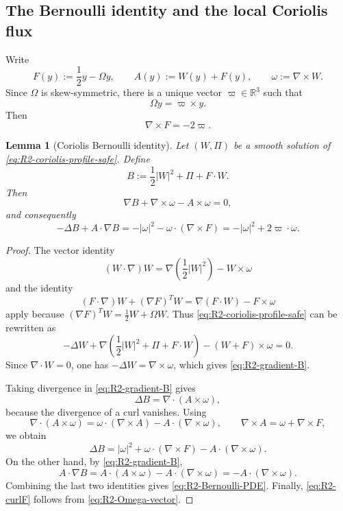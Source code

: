 \documentclass[11pt]{amsart}
\numberwithin{equation}{section}
\theoremstyle{plain}
\newtheorem{lemma}[theorem]{Lemma}
\theoremstyle{definition}
\theoremstyle{remark}
\begin{document}
\subsection{The Bernoulli identity and the local Coriolis flux}

Write
\begin{equation}\label{eq:R2-F-def}
   F(y):=\frac12y-\Omega y,
   \qquad
   A(y):=W(y)+F(y),
   \qquad
   \omega:=\nabla\times W .
\end{equation}
Since \(\Omega\) is skew-symmetric, there is a unique vector
\(\varpi\in\mathbb R^3\) such that
\begin{equation}\label{eq:R2-Omega-vector}
   \Omega y=\varpi\times y .
\end{equation}
Then
\begin{equation}\label{eq:R2-curlF}
   \nabla\times F=-2\varpi .
\end{equation}

\begin{lemma}[Coriolis Bernoulli identity]
\label{lem:R2-coriolis-bernoulli}
Let \((W,\Pi)\) be a smooth solution of
\eqref{eq:R2-coriolis-profile-safe}.  Define
\begin{equation}\label{eq:R2-Bernoulli-def}
   B:=\frac12|W|^2+\Pi+F\cdot W .
\end{equation}
Then
\begin{equation}\label{eq:R2-gradient-B}
   \nabla B+\nabla\times\omega-A\times\omega=0,
\end{equation}
and consequently
\begin{equation}\label{eq:R2-Bernoulli-PDE}
   -\Delta B+A\cdot\nabla B
   =
   -|\omega|^2-\omega\cdot(\nabla\times F)
   =
   -|\omega|^2+2\varpi\cdot\omega .
\end{equation}
\end{lemma}

\begin{proof}
The vector identity
\[
   (W\cdot\nabla)W=\nabla\left(\frac12|W|^2\right)-W\times\omega
\]
and the identity
\[
   (F\cdot\nabla)W+(\nabla F)^TW
   =\nabla(F\cdot W)-F\times\omega
\]
apply because
\((\nabla F)^TW=\frac12W+\Omega W\).  Thus
\eqref{eq:R2-coriolis-profile-safe} can be rewritten as
\[
   -\Delta W+
   \nabla\left(\frac12|W|^2+\Pi+F\cdot W\right)
   -(W+F)\times\omega=0 .
\]
Since \(\nabla\cdot W=0\), one has
\(-\Delta W=\nabla\times\omega\), which gives
\eqref{eq:R2-gradient-B}.

Taking divergence in \eqref{eq:R2-gradient-B} gives
\[
   \Delta B=\nabla\cdot(A\times\omega),
\]
because the divergence of a curl vanishes.  Using
\[
   \nabla\cdot(A\times\omega)
   =\omega\cdot(\nabla\times A)-A\cdot(\nabla\times\omega),
   \qquad
   \nabla\times A=\omega+\nabla\times F,
\]
we obtain
\[
   \Delta B
   =|\omega|^2+\omega\cdot(\nabla\times F)
      -A\cdot(\nabla\times\omega).
\]
On the other hand, by \eqref{eq:R2-gradient-B},
\[
   A\cdot\nabla B
   =A\cdot(A\times\omega)-A\cdot(\nabla\times\omega)
   =-A\cdot(\nabla\times\omega).
\]
Combining the last two identities gives \eqref{eq:R2-Bernoulli-PDE}.  Finally,
\eqref{eq:R2-curlF} follows from \eqref{eq:R2-Omega-vector}.
\end{proof}
\end{document}
